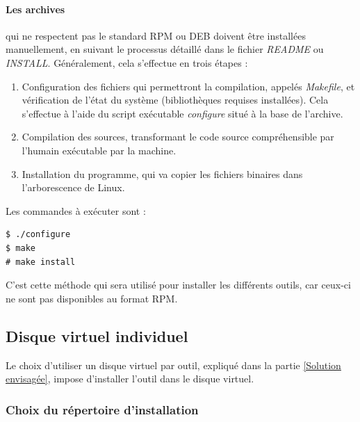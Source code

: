 \paragraph{Les archives}
qui ne respectent pas le standard RPM ou DEB doivent être installées manuellement, en suivant le processus détaillé dans le fichier \textit{README} ou \textit{INSTALL}.
Généralement, cela s'effectue en trois étapes :
\begin{enumerate}
	\item Configuration des fichiers qui permettront la compilation, appelés \textit{Makefile}, et vérification de l'état du système (bibliothèques requises installées).
Cela s'effectue à l'aide du script exécutable \textit{configure} situé à la base de l'archive.
	\item Compilation des sources, transformant le code source compréhensible par l'humain exécutable par la machine.
	\item Installation du programme, qui va copier les fichiers binaires dans l'arborescence de Linux.
\end{enumerate}
Les commandes à exécuter sont :
\begin{lstlisting}
$ ./configure
$ make
# make install
\end{lstlisting}
C'est cette méthode qui sera utilisé pour installer les différents outils, car ceux-ci ne sont pas disponibles au format RPM.
\\





\subsection{Disque virtuel individuel}

Le choix d'utiliser un disque virtuel par outil, expliqué dans la partie \ref{Solution envisagée}, impose d'installer l'outil dans le disque virtuel.
\\




\subsubsection{Choix du répertoire d'installation}

